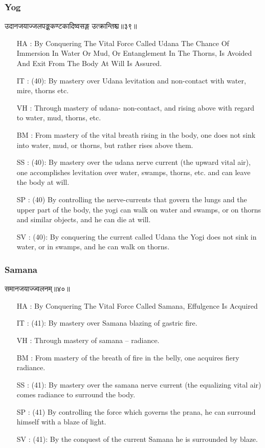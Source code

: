\begin{frame}[fragile]\frametitle{Yog}
\begin{sanskrit}
उदानजयाज्जलपङ्ककण्टकादिष्वसङ्ग उत्क्रान्तिश्च॥३९॥
\end{sanskrit}
	\begin{itemize}
	\item [HA]: By Conquering The Vital Force Called Udana The Chance Of Immersion In Water Or Mud, Or Entanglement In The Thorns, Is Avoided And Exit From The Body At Will Is Assured.
	\item [IT]: (40): By mastery over Udana levitation and non-contact with water, mire, thorns etc.
	\item [VH]: Through mastery of udana- non-contact, and rising above with regard to water, mud, thorns, etc.
	\item [BM]: From mastery of the vital breath rising in the body, one does not sink into water, mud, or thorns, but rather rises above them.
	\item [SS]: (40): By mastery over the udana nerve current (the upward vital air), one accomplishes levitation over water, swamps, thorns, etc. and can leave the body at will.
	\item [SP]: (40) By controlling the nerve-currents that govern the lungs and the upper part of the body, the yogi can walk on water and swamps, or on thorns and similar objects, and he can die at will.
	\item [SV]: (40): By conquering the current called Udana the Yogi does not sink in water, or in swamps, and he can walk on thorns. 
	\end{itemize}
\end{frame}

\begin{frame}[fragile]\frametitle{Samana}
\begin{sanskrit}
समानजयाज्ज्वलनम्॥४०॥
\end{sanskrit}
	\begin{itemize}
	\item [HA]: By Conquering The Vital Force Called Samana, Effulgence Is Acquired
	\item [IT]: (41): By mastery over Samana blazing of gastric fire.
	\item [VH]: Through mastery of samana – radiance.
	\item [BM]: From mastery of the breath of fire in the belly, one acquires fiery radiance.
	\item [SS]: (41): By mastery over the samana nerve current (the equalizing vital air) comes radiance to surround the body.
	\item [SP]: (41) By controlling the force which governs the prana, he can surround himself with a blaze of light.
	\item [SV]: (41): By the conquest of the current Samana he is surrounded by blaze. 
	\end{itemize}
\end{frame}

